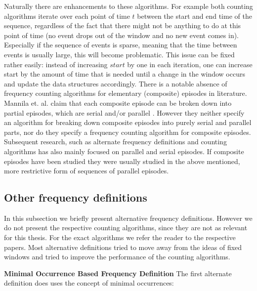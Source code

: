 
Naturally there are enhancements to these algorithms. For example both counting algorithms iterate over each point of time $t$ between the start and end time of the sequence, regardless of the fact that there might not be anything to do at this point of time (no event drops out of the window and no new event comes in). Especially if the sequence of events is sparse, meaning that the time between events is usually large, this will become problematic. This issue can be fixed rather easily: instead of increasing $start$ by one in each iteration, one can increase start by the amount of time that is needed until a change in the window occurs and update the data structures accordingly. \newline
There is a notable absence of frequency counting algorithms for elementary (composite) episodes in literature. Mannila et. al. claim that each composite episode can be broken down into partial episodes, which are serial and/or parallel \cite{mannila1997discovery}. However they neither specify an algorithm for breaking down composite episodes into purely serial and parallel parts, nor do they specify a frequency counting algorithm for composite episodes. Subsequent research, such as alternate frequency definitions and counting algorithms has also mainly focused on parallel and serial episodes. If composite episodes have been studied they were usually studied in the above mentioned, more restrictive form of sequences of parallel episodes. \newline

\subsection{Other frequency definitions}
\label{subsec_otherFrequency}

In this subsection we briefly present alternative frequency definitions. However we do not present the respective counting algorithms, since they are not as relevant for this thesis. For the exact algorithms we refer the reader to the respective papers. \newline
Most alternative definitions tried to move away from the ideas of fixed windows and tried to improve the performance of the counting algorithms. \newline \newline

\textbf{Minimal Occurrence Based Frequency Definition} \newline
The first alternate definition does uses the concept of minimal occurrences:

